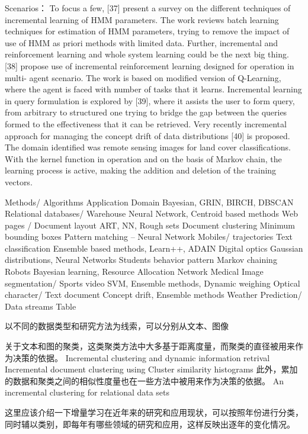 Scenarios：
To focus a few, [37] present a survey on the different techniques of incremental learning of HMM parameters. The work reviews batch learning techniques for estimation of HMM parameters, trying to remove the impact of use of HMM as priori methods with limited data.
Further, incremental and reinforcement learning and whole system learning could be the next big thing. [38] propose use of incremental reinforcement learning designed for operation in multi- agent scenario. The work is based on modified version of Q-Learning, where the agent is faced with number of tasks that it learns.
Incremental learning in query formulation is explored by [39], where it assists the user to form query, from arbitrary to structured one trying to bridge the gap between the queries formed to the effectiveness that it can be retrieved.
Very recently incremental approach for managing the concept drift of data distributions [40] is proposed. The domain identified was remote sensing images for land cover classifications. With the kernel function in operation and on the basis of Markov chain, the learning process is active, making the addition and deletion of the training vectors.


Methods/ Algorithms
Application Domain
Bayesian, GRIN, BIRCH, DBSCAN Relational databases/ Warehouse Neural Network, Centroid based methods Web pages / Document layout ART, NN, Rough sets
Document clustering
Minimum bounding boxes Pattern matching – Neural Network
Mobiles/ trajectories Text classification
Ensemble based methods, Learn++, ADAIN
Digital optics
Gaussian distributions, Neural Networks Students behavior pattern Markov chaining
Robots
Bayesian learning, Resource Allocation Network
Medical Image segmentation/ Sports video
SVM, Ensemble methods, Dynamic weighing
Optical character/ Text document Concept drift, Ensemble methods Weather Prediction/ Data streams Table

以不同的数据类型和研究方法为线索，可以分别从文本、图像

关于文本和图的聚类，这类聚类方法中大多基于距离度量，而聚类的直径被用来作为决策的依据。
Incremental clustering and dynamic information retrival
Incremental document clustering using Cluster similarity histograms
此外，累加的数据和聚类之间的相似性度量也在一些方法中被用来作为决策的依据。
An incremental clustering for relational data sets


这里应该介绍一下增量学习在近年来的研究和应用现状，可以按照年份进行分类，同时辅以类别，即每年有哪些领域的研究和应用，这样反映出逐年的变化情况。

